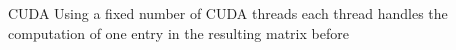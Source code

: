\begin{frame}{CUDA}
Using a fixed number of CUDA threads each thread handles the computation of one entry in the resulting matrix before 
\end{frame}